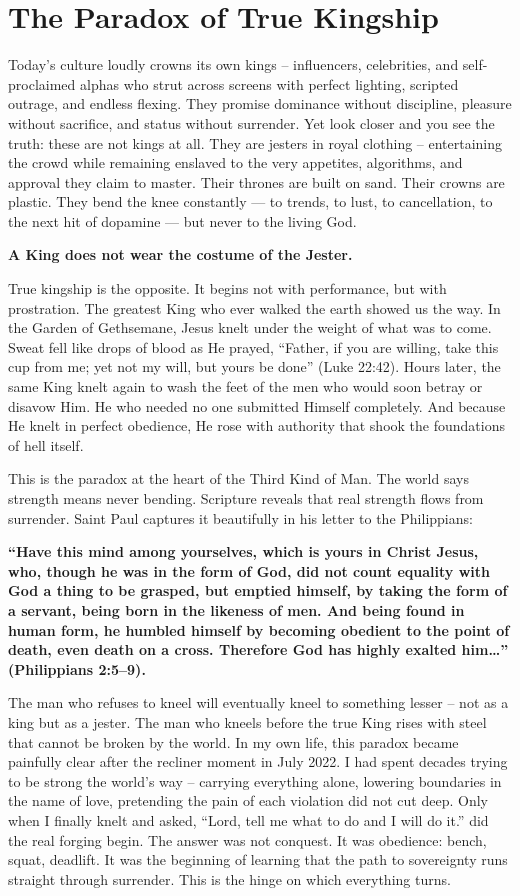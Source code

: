 \documentclass[12pt,a4paper]{book}
\begin{document}
\section{The Paradox of True Kingship}

Today’s culture loudly crowns its own kings -- influencers, celebrities, and self-proclaimed alphas who strut across screens with perfect lighting, scripted outrage, and endless flexing. They promise dominance without discipline, pleasure without sacrifice, and status without surrender. Yet look closer and you see the truth: these are not kings at all. They are jesters in royal clothing -- entertaining the crowd while remaining enslaved to the very appetites, algorithms, and approval they claim to master. Their thrones are built on sand. Their crowns are plastic. They bend the knee constantly — to trends, to lust, to cancellation, to the next hit of dopamine — but never to the living God.

\textbf{A King does not wear the costume of the Jester.}

True kingship is the opposite.  It begins not with performance,  but with prostration.  The greatest King who ever walked the earth showed us the way.  In the Garden of Gethsemane, Jesus knelt under the weight of what was to come.  Sweat fell like drops of blood as He prayed, “Father, if you are willing, take this cup from me; yet not my will, but yours be done” (Luke 22:42).   Hours later, the same King knelt again to wash the feet of the men who would soon betray or disavow Him.  He who needed no one submitted Himself completely.   And because He knelt in perfect obedience, He rose with authority that shook the foundations of hell itself.

This is the paradox at the heart of the Third Kind of Man. The world says strength means never bending.  Scripture reveals that real strength flows from surrender.  Saint Paul captures it beautifully in his letter to the Philippians: 

\textbf{“Have this mind among yourselves, which is yours in Christ Jesus, who, though he was in the form of God, did not count equality with God a thing to be grasped, but emptied himself, by taking the form of a servant, being born in the likeness of men.  And being found in human form, he humbled himself by becoming obedient to the point of death, even death on a cross. Therefore God has highly exalted him…” (Philippians 2:5–9).}

The man who refuses to kneel will eventually kneel to something lesser -- not as a king but as a jester. The man who kneels before the true King rises with steel that cannot be broken by the world.  In my own life, this paradox became painfully clear after the recliner moment in July 2022.   I had spent decades trying to be strong the world’s way -- carrying everything alone, lowering boundaries in the name of love, pretending the pain of each violation did not cut deep.   Only when I finally knelt and asked, “Lord, tell me what to do and I will do it.” did the real forging begin.  The answer was not conquest.  It was obedience: bench, squat, deadlift.  It was the beginning of learning that the path to sovereignty runs straight through surrender.  This is the hinge on which everything turns.
\end{document}
